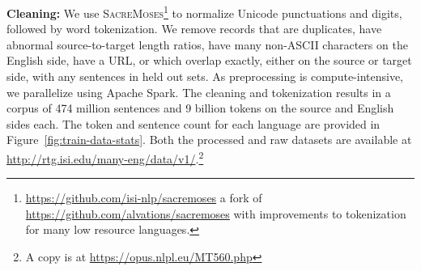 \textbf{Cleaning:}
 We use \textsc{SacreMoses}\footnote{\url{https://github.com/isi-nlp/sacremoses} a fork of \url{https://github.com/alvations/sacremoses} with improvements to tokenization for many low resource languages.} to normalize Unicode punctuations and digits, followed by word tokenization. 
We remove records that are duplicates, have abnormal source-to-target length ratios, have many non-ASCII characters on the English side, have a URL, or which overlap exactly, either on the source or target side, with any sentences in held out sets.
As preprocessing is compute-intensive, we parallelize using Apache Spark.
The cleaning and tokenization results in a corpus of 474 million sentences and 9 billion tokens on the source and English sides each. The token and sentence count for each language are provided in Figure~\ref{fig:train-data-stats}.
Both the processed and raw datasets are available at \url{http://rtg.isi.edu/many-eng/data/v1/}.\footnote{A copy is at \url{https://opus.nlpl.eu/MT560.php}}

